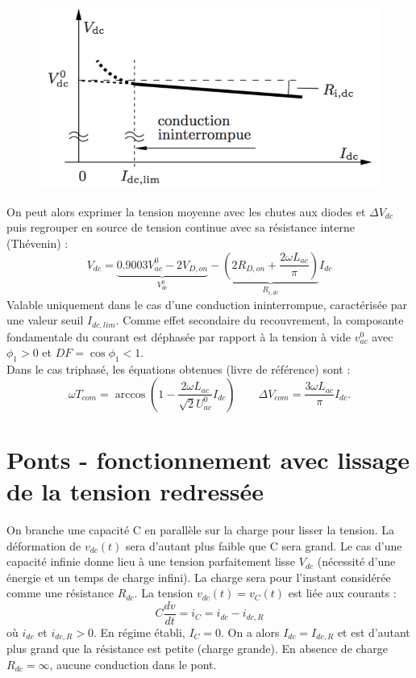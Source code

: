 		\begin{figure}
		\vspace{-5mm}
		\includegraphics[scale=0.3]{ch2/13}
		\end{figure} 
		On peut alors exprimer la tension moyenne avec les chutes aux diodes et $\Delta V_{dc}$ puis regrouper en source de tension continue avec sa résistance interne (Thévenin) : 
		\begin{equation}
			V_{dc} = \underbrace{0.9003 V_{ac}^0 - 2V_{D,on}}_{V_{dc}^0} - \underbrace{\left( 2 R_{D,on} + \frac{2\omega L_{ac}}{\pi} \right)}_{R_{i,dc}} I_{dc}
		\end{equation}		 
		Valable uniquement dans le cas d'une conduction ininterrompue, caractérisée par une valeur seuil $I_{dc,lim}$. Comme effet secondaire du recouvrement, la composante fondamentale du courant est déphasée par rapport à la tension à vide $v_{ac}^0$ avec $\phi _1 >0$ et $DF = \cos \phi _1 < 1$. \\
		
		Dans le cas triphasé, les équations obtenues (livre de référence) sont : 
		\begin{equation}
			\omega T_{com} = \arccos \left( 1-\frac{2\omega L_{ac}}{\sqrt{2}U_{ac}^0} I_{dc}\right) \qquad \Delta V_{com} = \frac{3\omega L_{ac}}{\pi} I_{dc}.
		\end{equation}
		
\section{Ponts - fonctionnement avec lissage de la tension redressée}
	On branche une capacité C en parallèle sur la charge pour lisser la tension. La déformation de $v_{dc}(t)$ sera d'autant plus faible que C sera grand. Le cas d'une capacité infinie donne lieu à une tension parfaitement lisse $V_{dc}$ (nécessité d'une énergie et un temps de charge infini). La charge sera pour l'instant considérée comme une résistance $R_{dc}$. La tension $v_{dc}(t) = v_C(t)$ est liée aux courants :
	\begin{equation}
		C\frac{dv}{dt} = i_C = i_{dc} - i_{dc,R}
		\label{eq:2.22}
	\end{equation}
	où $i_{dc}$ et $i_{dc,R} > 0$. En régime établi, $I_C = 0$. On a alors $I_{dc} = I_{dc,R}$ et est d'autant plus grand que la résistance est petite (charge grande). En absence de charge $R_{dc}=\infty$, aucune conduction dans le pont. 
	
